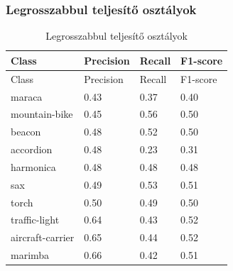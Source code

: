 \subsubsection{Legrosszabbul teljesítő osztályok}
  \begin{center}
    \begin{longtable}{llll}
    \caption{Legrosszabbul teljesítő osztályok}\label{tab:phase02_resnet50_legrosszabb_osztlyok}\\
    \toprule
    Class & Precision & Recall & F1-score \\
    \midrule
    \endfirsthead
    \toprule
    Class & Precision & Recall & F1-score \\
    \midrule
    \endhead
    maraca & 0.43 & 0.37 & 0.40 \\
    mountain-bike & 0.45 & 0.56 & 0.50 \\
    beacon & 0.48 & 0.52 & 0.50 \\
    accordion & 0.48 & 0.23 & 0.31 \\
    harmonica & 0.48 & 0.48 & 0.48 \\
    sax & 0.49 & 0.53 & 0.51 \\
    torch & 0.50 & 0.49 & 0.50 \\
    traffic-light & 0.64 & 0.43 & 0.52 \\
    aircraft-carrier & 0.65 & 0.44 & 0.52 \\
    marimba & 0.66 & 0.42 & 0.51 \\
    \bottomrule
    \end{longtable}
    \end{center}